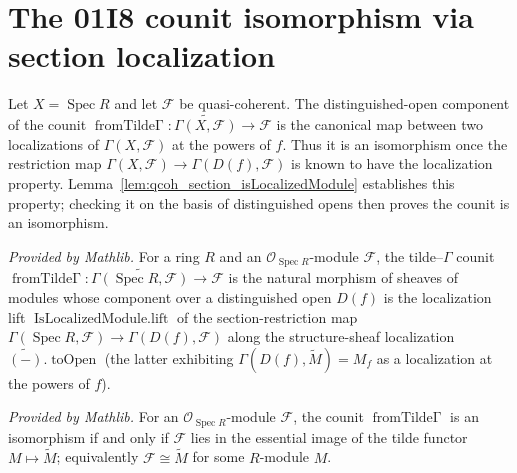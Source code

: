 \section{The 01I8 counit isomorphism via section localization}

Let \(X=\operatorname{Spec}R\) and let \(\mathcal F\) be quasi-coherent. The
distinguished-open component of the counit
\(\operatorname{fromTilde\Gamma}:\widetilde{\Gamma(X,\mathcal F)}\to\mathcal F\)
is the canonical map between two localizations of \(\Gamma(X,\mathcal F)\) at the
powers of \(f\). Thus it is an isomorphism once the restriction map
\(\Gamma(X,\mathcal F)\to\Gamma(D(f),\mathcal F)\) is known to have the localization
property. Lemma~\ref{lem:qcoh_section_isLocalizedModule} establishes this property;
checking it on the basis of distinguished opens then proves the counit is an
isomorphism.

\begin{lemma}
  \label{lem:fromTildeGamma_mathlib}
  \mathlibok
  \textit{Provided by Mathlib.}
  For a ring \(R\) and an \(\mathcal{O}_{\operatorname{Spec} R}\)-module \(\mathcal{F}\), the
  tilde--\(\Gamma\) counit
  \(\operatorname{fromTilde\Gamma} : \widetilde{\Gamma(\operatorname{Spec} R, \mathcal{F})} \to
  \mathcal{F}\) is the natural morphism of sheaves of modules whose component over a distinguished
  open \(D(f)\) is the localization lift \(\operatorname{IsLocalizedModule.lift}\) of the
  section-restriction map \(\Gamma(\operatorname{Spec} R, \mathcal{F}) \to \Gamma(D(f), \mathcal{F})\)
  along the structure-sheaf localization \(\widetilde{(-)}.\operatorname{toOpen}\) (the latter
  exhibiting \(\Gamma(D(f), \widetilde{M}) = M_f\) as a localization at the powers of \(f\)).
\end{lemma}

\begin{lemma}
  \label{lem:isIso_fromTildeGamma_iff_mathlib}
  \mathlibok
  \textit{Provided by Mathlib.}
  For an \(\mathcal{O}_{\operatorname{Spec} R}\)-module \(\mathcal{F}\), the counit
  \(\operatorname{fromTilde\Gamma}\) is an isomorphism if and only if \(\mathcal{F}\) lies in the
  essential image of the tilde functor \(M \mapsto \widetilde{M}\); equivalently
  \(\mathcal{F} \cong \widetilde{M}\) for some \(R\)-module \(M\).
\end{lemma}


